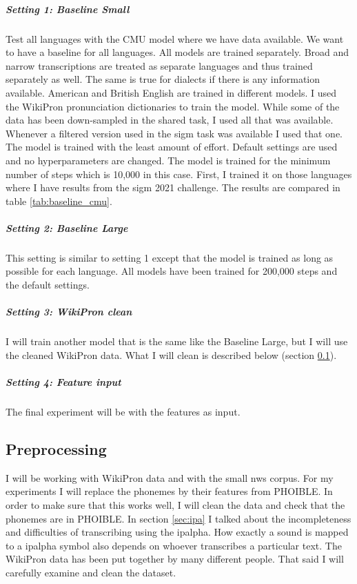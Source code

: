 
\subparagraph{Setting 1: Baseline Small}
Test all languages with the CMU model where we have data available. We want to have a baseline for all languages. All models are trained separately. Broad and narrow transcriptions are treated as separate languages and thus trained separately as well. The same is true for dialects if there is any information available. American and British English are trained in different models. I used the WikiPron pronunciation dictionaries to train the model. While some of the data has been down-sampled in the shared task, I used all that was available. Whenever a filtered version used in the \ac{sigm} task was available I used that one. The model is trained with the least amount of effort. Default settings are used and no hyperparameters are changed. The model is trained for the minimum number of steps which is 10,000 in this case.  First, I trained it on those languages where I have results from the \ac{sigm} 2021 challenge. The results are compared in table \ref{tab:baseline_cmu}.

\subparagraph{Setting 2: Baseline Large}
This setting is similar to setting 1 except that the model is trained as long as possible for each language. All models have been trained for 200,000 steps and the default settings. 

\subparagraph{Setting 3: WikiPron clean}
I will train another model that is the same like the Baseline Large, but I will use the cleaned WikiPron data. What I will clean is described below (section \ref{preprocess}).

\subparagraph{Setting 4: Feature input}
The final experiment will be with the features as input.  

\subsection{Preprocessing}
\label{preprocess}
I will be working with WikiPron data and with the small \ac{nws} corpus. For my experiments I will replace the phonemes by their features from PHOIBLE. In order to make sure that this works well, I will clean the data and check that the phonemes are in PHOIBLE. In section \ref{sec:ipa} I talked about the incompleteness and difficulties of transcribing using the \ac{ipalpha}. How exactly a sound is mapped to a \ac{ipalpha} symbol also depends on whoever transcribes a particular text. The WikiPron data has been put together by many different people. That said I will carefully examine and clean the dataset. 

